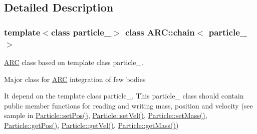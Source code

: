 \subsection{Detailed Description}
\subsubsection*{template$<$class particle\+\_\+$>$\newline
class A\+R\+C\+::chain$<$ particle\+\_\+ $>$}

\hyperlink{namespaceARC}{A\+RC} class based on template class particle\+\_\+. 

Major class for \hyperlink{namespaceARC}{A\+RC} integration of few bodies

It depend on the template class particle\+\_\+. This particle\+\_\+ class should contain public member functions for reading and writing mass, position and velocity (see sample in \hyperlink{classParticle_a97d76b66aed57834c105b78b10643b81}{Particle\+::set\+Pos()}, \hyperlink{classParticle_a07c405254ac3f03854e7523ff473c828}{Particle\+::set\+Vel()}, \hyperlink{classParticle_a620f479862b90468a77da4e9cf5c0ff5}{Particle\+::set\+Mass()}, \hyperlink{classParticle_a4ec76421cddd91b1f27357fb182f6923}{Particle\+::get\+Pos()}, \hyperlink{classParticle_ab3d63df7f8c22f232b096ae33b6ea3ac}{Particle\+::get\+Vel()}, \hyperlink{classParticle_a2576aff503f68e78ced91406512b1255}{Particle\+::get\+Mass()})

